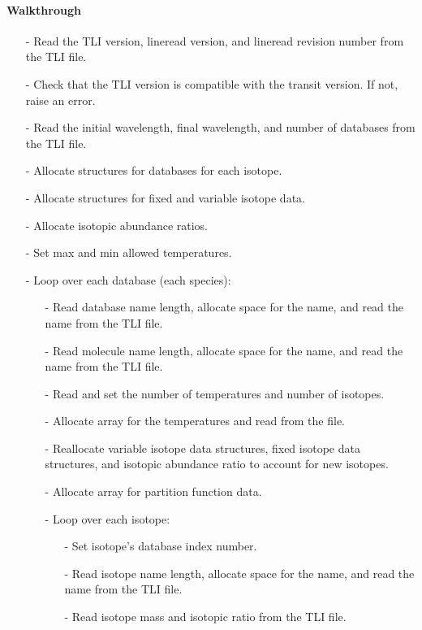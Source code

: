 \documentclass[letterpaper,12pt]{article}
\begin{document}
\paragraph{Walkthrough}
\begin{enumerate}[leftmargin=10pt, noitemsep, parsep=0pt, topsep=0ex]
\item[-] Read the TLI version, lineread version, and lineread revision number from the TLI file.
\item[-] Check that the TLI version is compatible with the transit version. If not, raise an error.
\item[-] Read the initial wavelength, final wavelength, and number of databases from the TLI file.
\item[-] Allocate structures for databases for each isotope.
\item[-] Allocate structures for fixed and variable isotope data.
\item[-] Allocate isotopic abundance ratios.
\item[-] Set max and min allowed temperatures.
\item[-] Loop over each database (each species):
\begin{enumerate}[leftmargin=10pt, noitemsep, parsep=0pt, topsep=0ex]
\item[-] Read database name length, allocate space for the name, and read the name from the TLI file.
\item[-] Read molecule name length, allocate space for the name, and read the name from the TLI file.
\item[-] Read and set the number of temperatures and number of isotopes.
\item[-] Allocate array for the temperatures and read from the file.
\item[-] Reallocate variable isotope data structures, fixed isotope data structures, and isotopic abundance ratio to account for new isotopes.
\item[-] Allocate array for partition function data.
\item[-] Loop over each isotope:
\begin{enumerate}[leftmargin=10pt, noitemsep, parsep=0pt, topsep=0ex]
\item[-] Set isotope's database index number.
\item[-] Read isotope name length, allocate space for the name, and read the name from the TLI file.
\item[-] Read isotope mass and isotopic ratio from the TLI file.
\end{enumerate}

\end{enumerate}
\end{enumerate}
\end{document}
